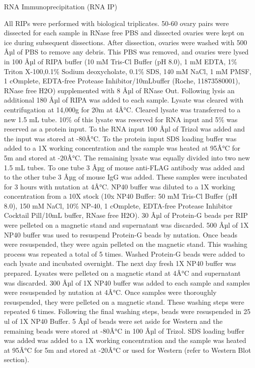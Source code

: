 \documentclass[12pt,twoside]{reedthesis}
\begin{document}
{RNA Immunoprecipitation (RNA IP)}

All RIPs were performed with biological triplicates. 50-60 ovary pairs
were dissected for each sample in RNase free PBS and dissected ovaries
were kept on ice during subsequent dissections. After dissection,
ovaries were washed with 500 Âµl of PBS to remove any debris. This PBS
was removed, and ovaries were lysed in 100 Âµl of RIPA buffer (10 mM
Tris-Cl Buffer (pH 8.0), 1 mM EDTA, 1\% Triton X-100,0.1\% Sodium
deoxycholate, 0.1\% SDS, 140 mM NaCl, 1 mM PMSF, 1 cOmplete, EDTA-free
Protease Inhibitor/10mLbuffer (Roche, 11873580001), RNase free H2O)
supplemented with 8 Âµl of RNase Out. Following lysis an additional 180
Âµl of RIPA was added to each sample. Lysate was cleared with
centrifugation at 14,000g for 20m at 4Â°C. Cleared lysate was transferred
to a new 1.5 mL tube. 10\% of this lysate was reserved for RNA input and
5\% was reserved as a protein input. To the RNA input 100 Âµl of Trizol
was added and the input was stored at -80Â°C. To the protein input SDS
loading buffer was added to a 1X working concentration and the sample
was heated at 95Â°C for 5m and stored at -20Â°C. The remaining lysate was
equally divided into two new 1.5 mL tubes. To one tube 3 Âµg of mouse
anti-FLAG antibody was added and to the other tube 3 Âµg of mouse IgG was
added. These samples were incubated for 3 hours with nutation at 4Â°C.
NP40 buffer was diluted to a 1X working concentration from a 10X stock
(10x NP40 Buffer: 50 mM Tris-Cl Buffer (pH 8.0), 150 mM NaCl, 10\% NP-40,
1 cOmplete, EDTA-free Protease Inhibitor Cocktail Pill/10mL buffer,
RNase free H2O). 30 Âµl of Protein-G beads per RIP were pelleted on a
magnetic stand and supernatant was discarded. 500 Âµl of 1X NP40 buffer
was used to resuspend Protein-G beads by nutation. Once beads were
resuspended, they were again pelleted on the magnetic stand. This
washing process was repeated a total of 5 times. Washed Protein-G beads
were added to each lysate and incubated overnight. The next day fresh 1X
NP40 buffer was prepared. Lysates were pelleted on a magnetic stand at
4Â°C and supernatant was discarded. 300 Âµl of 1X NP40 buffer was added to
each sample and samples were resuspended by nutation at 4Â°C. Once
samples were thoroughly resuspended, they were pelleted on a magnetic
stand. These washing steps were repeated 6 times. Following the final
washing steps, beads were resuspended in 25 ul of 1X NP40 Buffer. 5 Âµl
of beads were set aside for Western and the remaining beads were stored
at -80Â°C in 100 Âµl of Trizol. SDS loading buffer was added was added to
a 1X working concentration and the sample was heated at 95Â°C for 5m and
stored at -20Â°C or used for Western (refer to Western Blot section).
\end{document}
